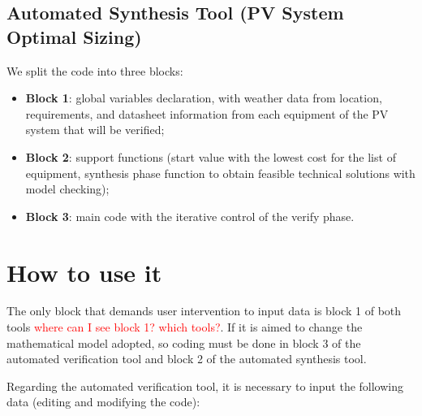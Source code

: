 \subsection{Automated Synthesis Tool (PV System Optimal Sizing)}
\label{sec:automatedsynthesis}

We split the code into three blocks:

\begin{itemize}
\item \textbf{Block 1}: global variables declaration, with weather data from location, requirements, and datasheet information from each equipment of the PV system that will be verified; 

\item \textbf{Block 2}: support functions (start value with the lowest cost for the list of equipment, synthesis phase function to obtain feasible technical solutions with model checking);

\item \textbf{Block 3}: main code with the iterative control of the verify phase.
\end{itemize}


\section{How to use it}

The only block that demands user intervention to input data is block 1 of both tools \textcolor{red}{where can I see block 1? which tools?}. If it is aimed to change the mathematical model adopted, so coding must be done in block 3 of the automated verification tool and block 2 of the automated synthesis tool.

Regarding the automated verification tool, it is necessary to input the following data (editing and modifying the code):

